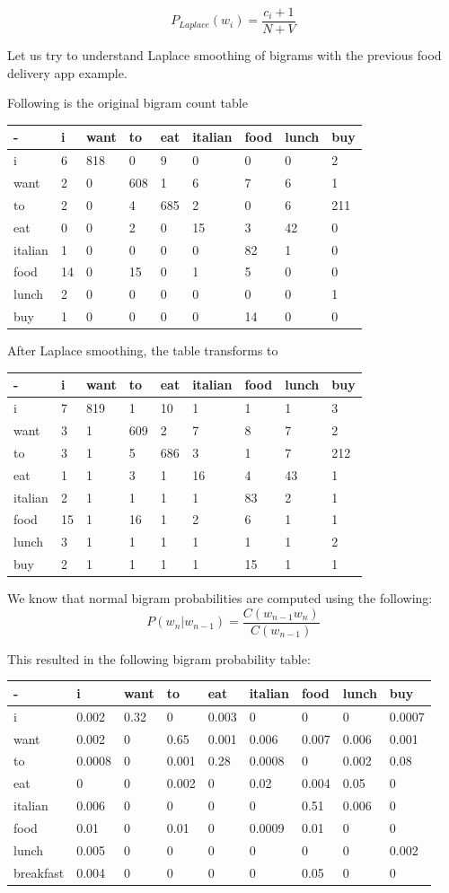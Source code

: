 \documentclass[11pt]{article}
\begin{document}
\[P_{Laplace}(w_i) = \frac{c_i + 1}{N + V}\]

Let us try to understand Laplace smoothing of bigrams with the previous
food delivery app example.

Following is the original bigram count table

\begin{longtable}[]{@{}lllllllll@{}}
\toprule
- & i & want & to & eat & italian & food & lunch & buy\tabularnewline
\midrule
\endhead
i & 6 & 818 & 0 & 9 & 0 & 0 & 0 & 2\tabularnewline
want & 2 & 0 & 608 & 1 & 6 & 7 & 6 & 1\tabularnewline
to & 2 & 0 & 4 & 685 & 2 & 0 & 6 & 211\tabularnewline
eat & 0 & 0 & 2 & 0 & 15 & 3 & 42 & 0\tabularnewline
italian & 1 & 0 & 0 & 0 & 0 & 82 & 1 & 0\tabularnewline
food & 14 & 0 & 15 & 0 & 1 & 5 & 0 & 0\tabularnewline
lunch & 2 & 0 & 0 & 0 & 0 & 0 & 0 & 1\tabularnewline
buy & 1 & 0 & 0 & 0 & 0 & 14 & 0 & 0\tabularnewline
\bottomrule
\end{longtable}

After Laplace smoothing, the table transforms to

\begin{longtable}[]{@{}lllllllll@{}}
\toprule
- & i & want & to & eat & italian & food & lunch & buy\tabularnewline
\midrule
\endhead
i & 7 & 819 & 1 & 10 & 1 & 1 & 1 & 3\tabularnewline
want & 3 & 1 & 609 & 2 & 7 & 8 & 7 & 2\tabularnewline
to & 3 & 1 & 5 & 686 & 3 & 1 & 7 & 212\tabularnewline
eat & 1 & 1 & 3 & 1 & 16 & 4 & 43 & 1\tabularnewline
italian & 2 & 1 & 1 & 1 & 1 & 83 & 2 & 1\tabularnewline
food & 15 & 1 & 16 & 1 & 2 & 6 & 1 & 1\tabularnewline
lunch & 3 & 1 & 1 & 1 & 1 & 1 & 1 & 2\tabularnewline
buy & 2 & 1 & 1 & 1 & 1 & 15 & 1 & 1\tabularnewline
\bottomrule
\end{longtable}

We know that normal bigram probabilities are computed using the
following: \[ P(w_n|w_{n-1}) = \frac{C(w_{n-1}w_n)}{C(w_{n-1})} \]

This resulted in the following bigram probability table:

\begin{longtable}[]{@{}lllllllll@{}}
\toprule
- & i & want & to & eat & italian & food & lunch & buy\tabularnewline
\midrule
\endhead
i & 0.002 & 0.32 & 0 & 0.003 & 0 & 0 & 0 & 0.0007\tabularnewline
want & 0.002 & 0 & 0.65 & 0.001 & 0.006 & 0.007 & 0.006 &
0.001\tabularnewline
to & 0.0008 & 0 & 0.001 & 0.28 & 0.0008 & 0 & 0.002 &
0.08\tabularnewline
eat & 0 & 0 & 0.002 & 0 & 0.02 & 0.004 & 0.05 & 0\tabularnewline
italian & 0.006 & 0 & 0 & 0 & 0 & 0.51 & 0.006 & 0\tabularnewline
food & 0.01 & 0 & 0.01 & 0 & 0.0009 & 0.01 & 0 & 0\tabularnewline
lunch & 0.005 & 0 & 0 & 0 & 0 & 0 & 0 & 0.002\tabularnewline
breakfast & 0.004 & 0 & 0 & 0 & 0 & 0.05 & 0 & 0\tabularnewline
\bottomrule
\end{longtable}
\end{document}
